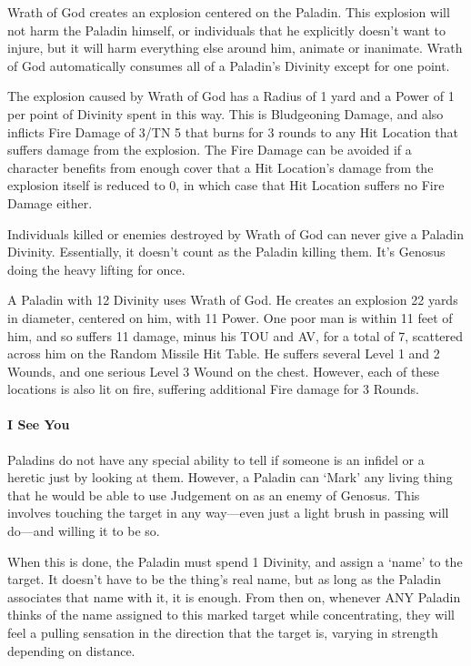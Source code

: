 \documentclass[oneside,11pt,english]{book}
\begin{document}
Wrath of God creates an explosion centered on the Paladin. This explosion will not harm the 
Paladin himself, or individuals that he explicitly doesn't want to injure, but it will harm 
everything else around him, animate or inanimate. Wrath of God automatically consumes all of a 
Paladin's Divinity except for one point. 


The explosion caused by Wrath of God has a Radius of 1 yard and a Power of 1 per point of 
Divinity spent in this way. This is Bludgeoning Damage, and also inflicts Fire Damage of 3/TN 5 
that burns for 3 rounds to any Hit Location that suffers damage from the explosion. The Fire 
Damage can be avoided if a character benefits from enough cover that a Hit Location's damage 
from the explosion itself is reduced to 0, in which case that Hit Location suffers no Fire Damage 
either. 


Individuals killed or enemies destroyed by Wrath of God can never give a Paladin Divinity. 
Essentially, it doesn't count as the Paladin killing them. It's Genosus doing the heavy lifting for 
once. 


A Paladin with 12 Divinity uses Wrath of God. He creates an explosion 22 yards in diameter, centered on him, with 11 
Power. One poor man is within 11 feet of him, and so suffers 11 damage, minus his TOU and AV, for a total of 7, 
scattered across him on the Random Missile Hit Table. He suffers several Level 1 and 2 Wounds, and one serious Level 
3 Wound on the chest. However, each of these locations is also lit on fire, suffering additional Fire damage for 3 
Rounds. 
 
\paragraph{I See You}
Paladins do not have any special ability to tell if someone is an infidel or a heretic just by looking 
at them. However, a Paladin can ‘Mark’ any living thing that he would be able to use Judgement 
on as an enemy of Genosus. This involves touching the target in any way—even just a light brush in passing will do—and willing it to be so.


When this is done, the Paladin must spend 1 Divinity, and assign a ‘name’ to the target. It doesn't have to be the thing's real name, but as long as the Paladin associates that name with it, it is enough. From then on, whenever ANY Paladin thinks of the name assigned to this marked target while concentrating, they will feel a pulling sensation in the direction that the target is, varying in strength depending on distance.
\end{document}
